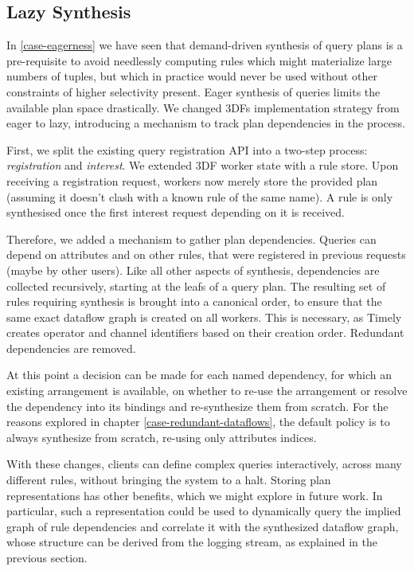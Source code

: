 \documentclass[../index.tex]{subfiles}
\begin{document}
\subsection{Lazy Synthesis} \label{lazy-synthesis}

In \autoref{case-eagerness} we have seen that demand-driven synthesis
of query plans is a pre-requisite to avoid needlessly computing rules
which might materialize large numbers of tuples, but which in practice
would never be used without other constraints of higher selectivity
present. Eager synthesis of queries limits the available plan space
drastically. We changed 3DFs implementation strategy from eager to
lazy, introducing a mechanism to track plan dependencies in the
process.

First, we split the existing query registration API into a two-step
process: \emph{registration} and \emph{interest}. We extended 3DF
worker state with a rule store. Upon receiving a registration request,
workers now merely store the provided plan (assuming it doesn't clash
with a known rule of the same name). A rule is only synthesised once
the first interest request depending on it is received.

Therefore, we added a mechanism to gather plan dependencies. Queries
can depend on attributes and on other rules, that were registered in
previous requests (maybe by other users). Like all other aspects of
synthesis, dependencies are collected recursively, starting at the
leafs of a query plan. The resulting set of rules requiring synthesis
is brought into a canonical order, to ensure that the same exact
dataflow graph is created on all workers. This is necessary, as Timely
creates operator and channel identifiers based on their creation
order. Redundant dependencies are removed.

At this point a decision can be made for each named dependency, for
which an existing arrangement is available, on whether to re-use the
arrangement or resolve the dependency into its bindings and
re-synthesize them from scratch. For the reasons explored in chapter
\ref{case-redundant-dataflows}, the default policy is to always
synthesize from scratch, re-using only attributes indices.

With these changes, clients can define complex queries interactively,
across many different rules, without bringing the system to a
halt. Storing plan representations has other benefits, which we might
explore in future work. In particular, such a representation could be
used to dynamically query the implied graph of rule dependencies and
correlate it with the synthesized dataflow graph, whose structure can
be derived from the logging stream, as explained in the previous
section.
\end{document}
